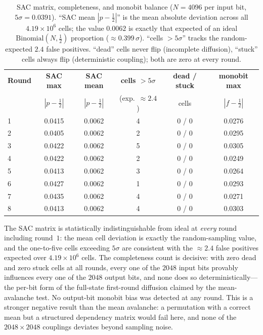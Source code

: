 \documentclass[11pt]{article}
\begin{document}
\begin{table}[h]
\centering
\begin{tabular}{lccccc}
  \toprule
  \textbf{Round} & \textbf{SAC max} & \textbf{SAC mean} &
  \textbf{cells $>5\sigma$} & \textbf{dead / stuck} & \textbf{monobit max} \\
   & $|p{-}\tfrac12|$ & $|p{-}\tfrac12|$ & (exp.\ $\approx2.4$) & cells & $|f{-}\tfrac12|$ \\
  \midrule
  1 & 0.0415 & 0.0062 & 4 & 0 / 0 & 0.0276 \\
  2 & 0.0405 & 0.0062 & 2 & 0 / 0 & 0.0295 \\
  3 & 0.0422 & 0.0062 & 5 & 0 / 0 & 0.0305 \\
  4 & 0.0422 & 0.0062 & 2 & 0 / 0 & 0.0249 \\
  5 & 0.0413 & 0.0062 & 3 & 0 / 0 & 0.0264 \\
  6 & 0.0427 & 0.0062 & 1 & 0 / 0 & 0.0293 \\
  7 & 0.0435 & 0.0062 & 4 & 0 / 0 & 0.0271 \\
  8 & 0.0413 & 0.0062 & 4 & 0 / 0 & 0.0303 \\
  \bottomrule
\end{tabular}
\caption{SAC matrix, completeness, and monobit balance ($N=4096$ per input bit,
$5\sigma=0.0391$). ``SAC mean $|p{-}\tfrac12|$'' is the mean absolute deviation
across all $4.19\times10^{6}$ cells; the value $0.0062$ is exactly that expected
of an ideal $\mathrm{Binomial}(N,\tfrac12)$ proportion
($\approx0.399\,\sigma$). ``cells $>5\sigma$'' tracks the random-expected $2.4$
false positives. ``dead'' cells never flip (incomplete diffusion), ``stuck''
cells always flip (deterministic coupling); both are zero at every round.}
\end{table}

The SAC matrix is statistically indistinguishable from ideal at \emph{every}
round including round~$1$: the mean cell deviation is exactly the random-sampling
value, and the one-to-five cells exceeding $5\sigma$ are consistent with the
$\approx2.4$ false positives expected over $4.19\times10^{6}$ cells. The
completeness count is decisive: with zero dead and zero stuck cells at all
rounds, every one of the $2048$ input bits provably influences every one of the
$2048$ output bits, and none does so deterministically---the per-bit form of the
full-state first-round diffusion claimed by the mean-avalanche test. No
output-bit monobit bias was detected at any round. This is a stronger negative
result than the mean avalanche: a permutation with a correct mean but a
structured dependency matrix would fail here, and none of the $2048\times2048$
couplings deviates beyond sampling noise.
\end{document}
